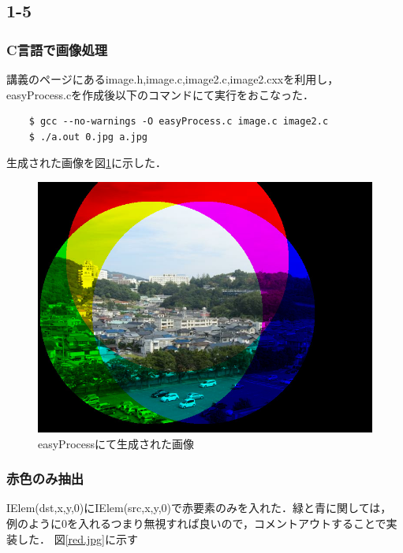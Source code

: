 \documentclass[11pt]{jarticle}
\begin{document}
\subsection{1-5}
\subsubsection{C言語で画像処理}
講義のページにあるimage.h,image.c,image2.c,image2.cxxを利用し，
easyProcess.cを作成後以下のコマンドにて実行をおこなった．

\begin{verbatim}
    $ gcc --no-warnings -O easyProcess.c image.c image2.c
    $ ./a.out 0.jpg a.jpg
\end{verbatim}

生成された画像を図\ref{a.jpg}に示した．
\begin{figure}[htbp]
    \centering
    \includegraphics[scale=.2]{a.jpg}
    \caption{easyProcessにて生成された画像}
    \label{a.jpg}
\end{figure}

\subsubsection{赤色のみ抽出}
IElem(dst,x,y,0)にIElem(src,x,y,0)で赤要素のみを入れた．緑と青に関しては，
例のように0を入れるつまり無視すれば良いので，コメントアウトすることで実装した．
図\ref{red.jpg}に示す
\end{document}
